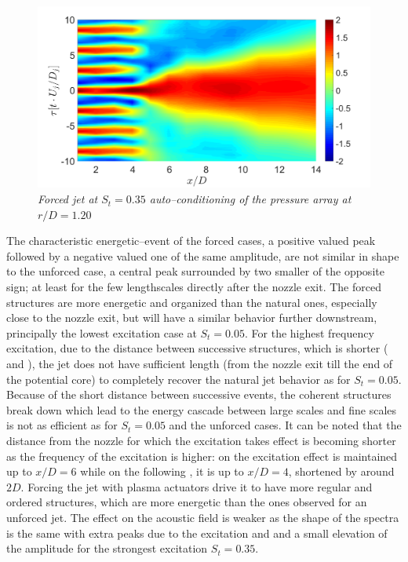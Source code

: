 \begin{figure}
	\centering
	\includegraphics[width=1\textwidth]{Figures/conditioning/autoCondSt0p35.png}
	\caption{\textit{Forced jet at $S_t = 0.35$ auto--conditioning of the pressure array at $r/D = 1.20$}}
	\label{fig:autoCondSt0p35}
\end{figure}
The characteristic energetic--event of the forced cases, a positive valued peak followed by a negative valued one of the same amplitude, are not similar in shape to the unforced case, a central peak surrounded by two smaller of the opposite sign; at least for the few lengthscales directly after the nozzle exit.
The forced structures are more energetic and organized than the natural ones, especially close to the nozzle exit, but will have a similar behavior further downstream, principally the lowest excitation case at $S_t = 0.05$.
For the highest frequency excitation, due to the distance between successive structures, which is shorter ( and ), the jet does not have sufficient length (from the nozzle exit till the end of the potential core) to completely recover the natural jet behavior as for $S_t = 0.05$.
Because of the short distance between successive events, the coherent structures break down which lead to the energy cascade between large scales and fine scales is not as efficient as for $S_t = 0.05$ and the unforced cases.
It can be noted that the distance from the nozzle for which the excitation takes effect is becoming shorter as the frequency of the excitation is higher: on  the excitation effect is maintained up to $x/D=6$ while on the following , it is up to $x/D=4$, shortened by around $2D$.
Forcing the jet with plasma actuators drive it to have more regular and ordered structures, which are more energetic than the ones observed for an unforced jet. The effect on the acoustic field is weaker as the shape of the spectra is the same  with extra peaks due to the excitation and and a small elevation of the amplitude for the strongest excitation $S_t = 0.35$.

